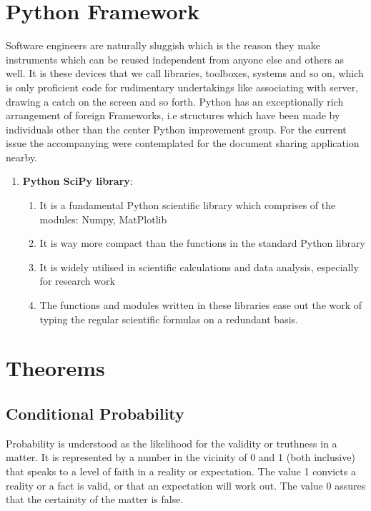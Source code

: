 \section{Python Framework}
Software engineers are naturally sluggish which is the reason they make instruments which can be reused independent from anyone else and others as well. It is these devices that we call libraries, toolboxes, systems and so on, which is only proficient code for rudimentary undertakings like associating with server, drawing a catch on the screen and so forth. Python has an exceptionally rich arrangement of foreign Frameworks, i.e structures which have been made by individuals other than the center Python improvement group. For the current issue the accompanying were contemplated for the document sharing application nearby.
\begin{enumerate}
\item \textbf{Python SciPy library}: 
  \begin{enumerate}
  \item It is a fundamental Python scientific library which comprises of the modules: Numpy, MatPlotlib 
  \item It is way more compact than the functions in the standard Python library
  \item It is widely utilised in scientific calculations and data analysis, especially for research work
  \item The functions and modules written in these libraries ease out the work of typing the regular scientific formulas on a redundant basis.
  \end{enumerate}
\end{enumerate}

\section{Theorems}

\subsection{Conditional Probability}
Probability is understood as the likelihood for the validity or truthness in a matter. It is represented by a number in the vicinity of 0 and 1 (both inclusive) that speaks to a level of faith in a reality or expectation. The value 1 convicts a reality or a fact is valid, or that an expectation will work out. The value 0 assures that the certainity of the matter is false.

